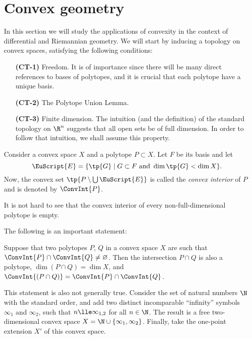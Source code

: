 \documentclass[12pt, a4paper]{article}
\newcommand{\E}{\EuScript{E}}
\begin{document}
\section{Convex geometry}

In this section we will study the applications of convexity in the context of differential and Riemannian geometry. We will start by inducing a topology on convex spaces, satisfying the following conditions:

\begin{itemize}\label{CT}
    \item[\textbf{(CT-1)}] Freedom. It is of importance since there will be many direct references to bases of polytopes, and it is crucial that each polytope have a unique basis.
    \item[\textbf{(CT-2)}] The Polytope Union Lemma.
    \item[\textbf{(CT-3)}] Finite dimension. The intuition (and the definition) of the standard topology on \(\R^n\) suggests that all open sets be of full dimension. In order to follow that intuition, we shall assume this property.
\end{itemize}

\begin{definition}\label{def-poly-int}
    Consider a convex space \(X\) and a polytope \(P \subset X\). Let \(F\) be its basis and let \[\E = \{\tp{G} \mid G \subset F \mbox{ and } \dim \tp{G} < \dim X\}.\] Now, the convex set \(\tp{P \setminus \bigcup \E}\) is called the \textit{convex interior} of \(P\) and is denoted by \(\ConvInt{P}\). 
\end{definition}

\begin{remark}
    It is not hard to see that the convex interior of every non-full-dimensional polytope is empty.
\end{remark}

The following is an important statement:

\begin{lemma}\label{tpil}
    Suppose that two polytopes \(P\), \(Q\) in a convex space \(X\) are such that \(\ConvInt{P} \cap \ConvInt{Q} \ne \varnothing\). Then the intersection \(P \cap Q\) is also a polytope, \(\dim{(P \cap Q)} = \dim X\), and \(\ConvInt{(P \cap Q)} = \ConvInt{P} \cap \ConvInt{Q}\).
\end{lemma}

This statement is also not generally true. Consider the set of natural numbers \(\N\) with the standard order, and add two distinct incomparable ``infinity'' symbols \(\infty_1\) and \(\infty_2\), such that \(n \lle \infty_{1,2}\) for all \(n \in \N\). The result is a free two-dimensional convex space \(X = \N \cup \{\infty_1, \infty_2\}\). Finally, take the one-point extension \(X'\) of this convex space.
\end{document}
